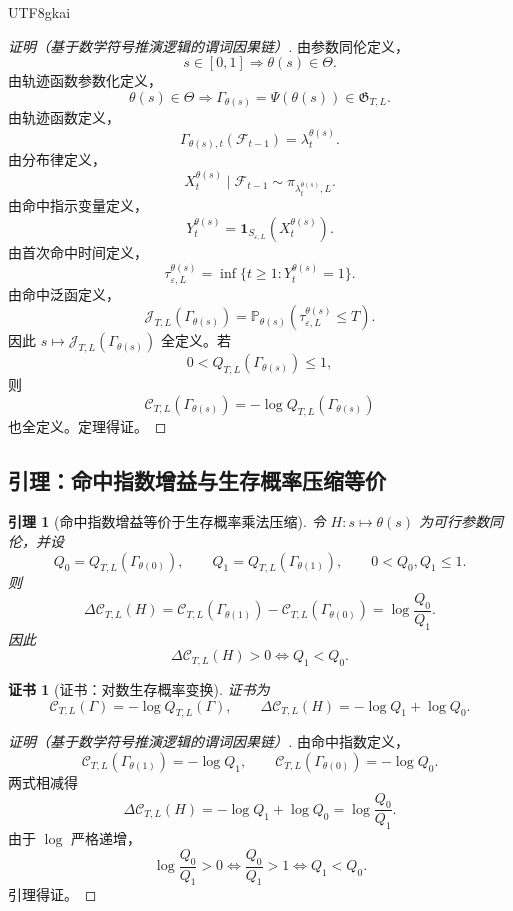 \documentclass[12pt]{article}
\newtheorem{lemma}{引理}[section]
\newtheorem{Certificate}{证书}[section]
\newcommand{\Prob}{\mathbb P}
\newcommand{\Fil}{\mathcal F}
\begin{document}
\begin{CJK*}{UTF8}{gkai}
\begin{proof}[证明（基于数学符号推演逻辑的谓词因果链）]
由参数同伦定义，
\[
  s\in[0,1]
  \Longrightarrow
  \theta(s)\in\Theta.
\]
由轨迹函数参数化定义，
\[
  \theta(s)\in\Theta
  \Longrightarrow
  \Gamma_{\theta(s)}=\Psi(\theta(s))\in\mathfrak G_{T,L}.
\]
由轨迹函数定义，
\[
  \Gamma_{\theta(s),t}(\Fil_{t-1})
  =
  \lambda_t^{\theta(s)}.
\]
由分布律定义，
\[
  X_t^{\theta(s)}
  \mid
  \Fil_{t-1}
  \sim
  \pi_{\lambda_t^{\theta(s)},L}.
\]
由命中指示变量定义，
\[
  Y_t^{\theta(s)}
  =
  \mathbf 1_{S_{\varepsilon,L}}
  (X_t^{\theta(s)}).
\]
由首次命中时间定义，
\[
  \tau_{\varepsilon,L}^{\theta(s)}
  =
  \inf\{t\ge1:Y_t^{\theta(s)}=1\}.
\]
由命中泛函定义，
\[
  \mathcal J_{T,L}(\Gamma_{\theta(s)})
  =
  \Prob_{\theta(s)}
  (
  \tau_{\varepsilon,L}^{\theta(s)}
  \le T
  ).
\]
因此 \(s\mapsto\mathcal J_{T,L}(\Gamma_{\theta(s)})\) 全定义。若
\[
  0<Q_{T,L}(\Gamma_{\theta(s)})\le1,
\]
则
\[
  \mathcal C_{T,L}(\Gamma_{\theta(s)})
  =
  -\log Q_{T,L}(\Gamma_{\theta(s)})
\]
也全定义。定理得证。
\end{proof}

\subsection{引理：命中指数增益与生存概率压缩等价}
\label{subsec:tex57-index-survival-lemma}

\begin{lemma}[命中指数增益等价于生存概率乘法压缩]
\label{lem:tex57-index-survival}
令 \(H:s\mapsto\theta(s)\) 为可行参数同伦，并设
\[
  Q_0=Q_{T,L}(\Gamma_{\theta(0)}),
  \qquad
  Q_1=Q_{T,L}(\Gamma_{\theta(1)}),
  \qquad
  0<Q_0,Q_1\le1.
\]
则
\[
  \Delta\mathcal C_{T,L}(H)
  =
  \mathcal C_{T,L}(\Gamma_{\theta(1)})
  -
  \mathcal C_{T,L}(\Gamma_{\theta(0)})
  =
  \log\frac{Q_0}{Q_1}.
\]
因此
\[
  \Delta\mathcal C_{T,L}(H)>0
  \Longleftrightarrow
  Q_1<Q_0.
\]
\end{lemma}

\begin{Certificate}[证书：对数生存概率变换]
\label{cert:tex57-index-survival}
证书为
\[
  \mathcal C_{T,L}(\Gamma)=-\log Q_{T,L}(\Gamma),
  \qquad
  \Delta\mathcal C_{T,L}(H)
  =
  -\log Q_1+\log Q_0.
\]
\end{Certificate}

\begin{proof}[证明（基于数学符号推演逻辑的谓词因果链）]
由命中指数定义，
\[
  \mathcal C_{T,L}(\Gamma_{\theta(1)})
  =
  -\log Q_1,
  \qquad
  \mathcal C_{T,L}(\Gamma_{\theta(0)})
  =
  -\log Q_0.
\]
两式相减得
\[
  \Delta\mathcal C_{T,L}(H)
  =
  -\log Q_1+\log Q_0
  =
  \log\frac{Q_0}{Q_1}.
\]
由于 \(\log\) 严格递增，
\[
  \log\frac{Q_0}{Q_1}>0
  \Longleftrightarrow
  \frac{Q_0}{Q_1}>1
  \Longleftrightarrow
  Q_1<Q_0.
\]
引理得证。
\end{proof}


\end{CJK*}
\end{document}
